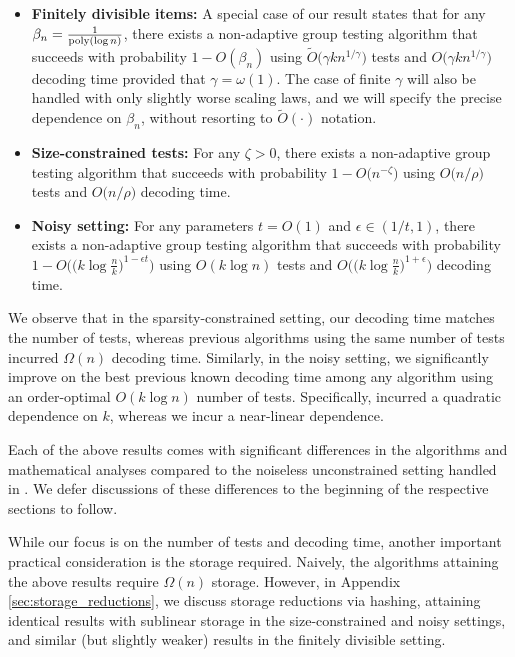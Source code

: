 \begin{itemize}
    \item \textbf{Finitely divisible items:} A special case of our result states that for any $\beta_n = \frac{1}{{\rm poly}(\log n)}$, there exists a non-adaptive group testing algorithm that succeeds with probability $1-O(\beta_n)$ using $\widetilde{O}\big(\gamma kn^{1/\gamma}\big)$ tests and $O\big(\gamma kn^{1/\gamma}\big)$ decoding time provided that $\gamma = \omega(1)$.  The case of finite $\gamma$ will also be handled with only slightly worse scaling laws, and we will specify the precise dependence on $\beta_n$, without resorting to $\widetilde{O}(\cdot)$ notation.
    \item \textbf{Size-constrained tests:} For any $\zeta>0$, there exists a non-adaptive group testing algorithm that succeeds with probability $1-O\big(n^{-\zeta}\big)$ using $O\big(n/\rho\big)$ tests and $O\big(n/\rho\big)$ decoding time.
    \item \textbf{Noisy setting:} For any parameters $t=O(1)$ and $\epsilon\in(1/t,1)$, there exists a non-adaptive group testing algorithm that succeeds with probability $1-O\big(\big(k\log\frac{n}{k}\big)^{1-\epsilon t}\big)$ using $O(k\log n)$ tests and $O\big(\big(k\log\frac{n}{k}\big)^{1+\epsilon}\big)$ decoding time.
\end{itemize}
We observe that in the sparsity-constrained setting, our decoding time matches the number of tests, whereas previous algorithms using the same number of tests incurred $\Omega(n)$ decoding time.  Similarly, in the noisy setting, we significantly improve on the best previous known decoding time among any algorithm using an order-optimal $O(k \log n)$ number of tests.  Specifically, \cite{Bon19a} incurred a quadratic dependence on $k$, whereas we incur a near-linear dependence.

Each of the above results comes with significant differences in the algorithms and mathematical analyses compared to the noiseless unconstrained setting handled in \cite{Eri20,cher20}.  We defer discussions of these differences to the beginning of the respective sections to follow.

While our focus is on the number of tests and decoding time, another important practical consideration is the storage required.  Naively, the algorithms attaining the above results require $\Omega(n)$ storage.  However, in Appendix \ref{sec:storage_reductions}, we discuss storage reductions via hashing, attaining identical results with sublinear storage in the size-constrained and noisy settings, and similar (but slightly weaker) results in the finitely divisible setting.

